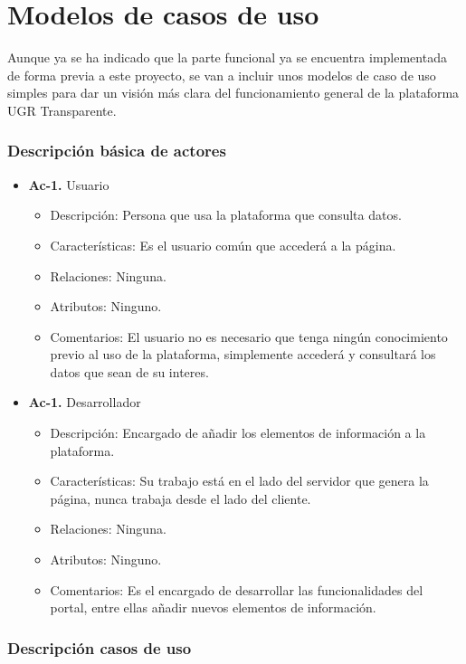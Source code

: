 \section{Modelos de casos de uso}

Aunque ya se ha indicado que la parte funcional ya se encuentra implementada de forma previa a este proyecto, se van a incluir
unos modelos de caso de uso simples para dar un visión más clara del funcionamiento general de la plataforma UGR Transparente.

\subsubsection*{Descripción básica de actores}

\begin{itemize}
  \item \textbf{Ac-1.} Usuario
  \begin{itemize}
   \item Descripción: Persona que usa la plataforma que consulta datos.
   \item Características: Es el usuario común que accederá a la página.
   \item Relaciones: Ninguna.
   \item Atributos: Ninguno.
   \item Comentarios: El usuario no es necesario que tenga ningún conocimiento previo al uso de la plataforma, simplemente
   accederá y consultará los datos que sean de su interes.
  \end{itemize}
    \item \textbf{Ac-1.} Desarrollador
  \begin{itemize}
   \item Descripción: Encargado de añadir los elementos de información a la plataforma.
   \item Características: Su trabajo está en el lado del servidor que genera la página, nunca trabaja desde el lado del cliente.
   \item Relaciones: Ninguna.
   \item Atributos: Ninguno.
   \item Comentarios: Es el encargado de desarrollar las funcionalidades del portal, entre ellas añadir nuevos elementos de
   información.
  \end{itemize}
\end{itemize}

\subsubsection*{Descripción casos de uso}

